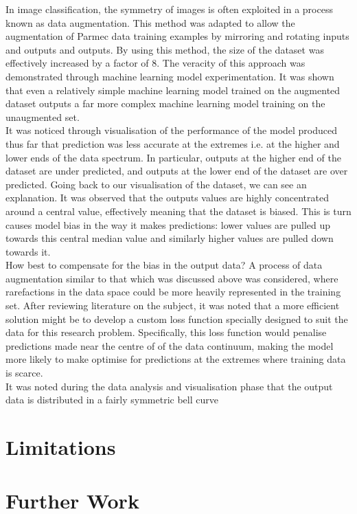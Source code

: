 \noindent In image classification, the symmetry of images is often exploited in a process known as data augmentation.  This method was adapted to allow the augmentation of Parmec  data training examples by mirroring and rotating inputs and outputs and outputs. By using this method, the size of the dataset was effectively increased by a factor of 8. The veracity of this approach was demonstrated through machine learning model experimentation. It was shown that even a relatively simple machine learning model trained on the augmented dataset outputs a far more complex machine learning model training on the unaugmented set. \\ 

\noindent  
It was noticed through visualisation of the performance of the model produced thus far that prediction was less accurate at the extremes i.e. at the higher and lower ends of the data spectrum. In particular, outputs at the higher end of the dataset are under predicted, and outputs at the lower end of the dataset are over predicted. Going back to our visualisation of the dataset, we can see an explanation. It was observed that the outputs values are highly concentrated around a central value, effectively meaning that the dataset is biased. This is turn causes model bias in the way it makes predictions: lower values are pulled up towards this central median value and similarly higher values are pulled down towards it.  \\

\noindent
How best to compensate for the bias in the output data? A process of data augmentation similar to that which was discussed above was considered, where rarefactions in the data space could be more heavily represented in the training set. After reviewing literature on the subject, it was noted that a more efficient solution might be to develop a custom loss function specially designed to suit the data for this research problem. Specifically, this loss function would penalise predictions made near the centre of of the data continuum, making the model more likely to make optimise for predictions at the extremes where training data is scarce. \\

\noindent
It was noted during the data analysis and visualisation phase that the output data is distributed in a fairly symmetric bell curve   
 
 \section{Limitations}

\section{Further Work}




